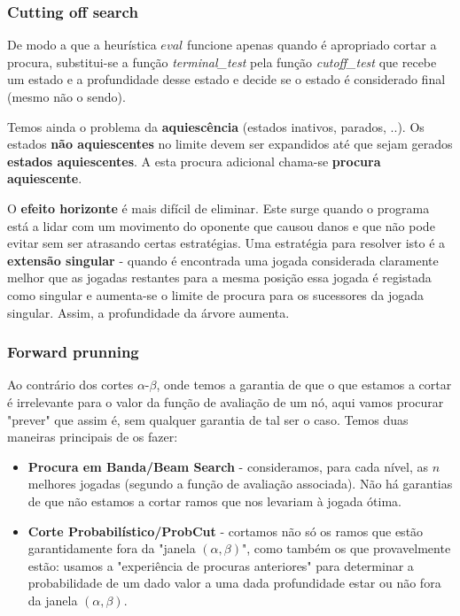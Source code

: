 \documentclass[11pt]{article}
\begin{document}
\subsubsection{Cutting off search}

De modo a que a heurística $eval$ funcione apenas quando é apropriado cortar a procura, substitui-se a função \textit{terminal\_test} pela função \textit{cutoff\_test} que recebe um estado e a profundidade desse estado e decide se o estado é considerado final (mesmo não o sendo).\vspace{4pt}

Temos ainda o problema da \textbf{aquiescência} (estados inativos, parados, ..). Os estados \textbf{não aquiescentes} no limite devem ser expandidos até que sejam gerados \textbf{estados aquiescentes}. A esta procura adicional chama-se \textbf{procura aquiescente}.\vspace{4pt}

O \textbf{efeito horizonte} é mais difícil de eliminar. Este surge quando o programa está a lidar com um movimento do oponente que causou danos e que não pode evitar sem ser atrasando certas estratégias. Uma estratégia para resolver isto é a \textbf{extensão singular} - quando é encontrada uma jogada considerada claramente melhor que as jogadas restantes para a mesma posição essa jogada é registada como singular e aumenta-se o limite de procura para os sucessores da jogada singular. Assim, a profundidade da árvore aumenta.

\subsubsection{Forward prunning}

Ao contrário dos cortes $\alpha$-$\beta$, onde temos a garantia de que o que estamos a cortar é irrelevante para o valor da função de avaliação de um nó, aqui vamos procurar "prever" que assim é, sem qualquer garantia de tal ser o caso. Temos duas maneiras principais de os fazer:
\begin{itemize}
    \item \textbf{Procura em Banda/Beam Search} - consideramos, para cada nível, as $n$ melhores jogadas (segundo a função de avaliação associada). Não há garantias de que não estamos a cortar ramos que nos levariam à jogada ótima.
    \item \textbf{Corte Probabilístico/ProbCut} - cortamos não só os ramos que estão garantidamente fora da "janela $(\alpha,\beta)$", como também os que provavelmente estão: usamos a "experiência de procuras anteriores" para determinar a probabilidade de um dado valor a uma dada profundidade estar ou não fora da janela $(\alpha,\beta)$.
\end{itemize}
\end{document}
